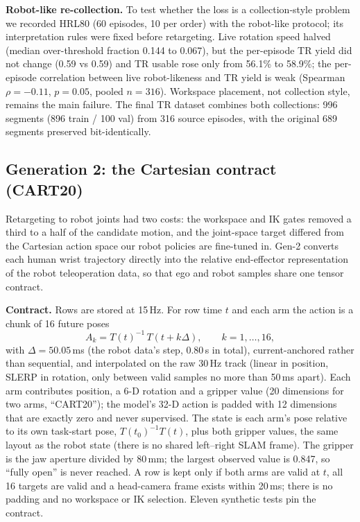\documentclass[conference,10pt]{IEEEtran}
\newcommand{\mm}{\,mm\xspace}
\begin{document}
\textbf{Robot-like re-collection.} To test whether the loss is a collection-style problem we recorded HRL80 (60 episodes, 10 per
order) with the robot-like protocol; its interpretation rules were fixed before retargeting. Live rotation speed halved (median
over-threshold fraction 0.144 to 0.067), but the per-episode TR yield did not change (0.59 vs 0.59) and TR usable rose only from
56.1\% to 58.9\%; the per-episode correlation between live robot-likeness and TR yield is weak (Spearman $\rho=-0.11$, $p=0.05$,
pooled $n=316$). Workspace placement, not collection style, remains the main failure. The final TR dataset combines both
collections: 996 segments (896 train / 100 val) from 316 source episodes, with the original 689 segments preserved bit-identically.

\subsection{Generation 2: the Cartesian contract (CART20)}
Retargeting to robot joints had two costs: the workspace and IK gates removed a third to a half of the candidate motion, and the
joint-space target differed from the Cartesian action space our robot policies are fine-tuned in. Gen-2 converts each human wrist
trajectory directly into the relative end-effector representation of the robot teleoperation data, so that ego and robot samples
share one tensor contract.

\textbf{Contract.} Rows are stored at 15\,Hz. For row time $t$ and each arm the action is a chunk of 16 future poses
\begin{equation}
A_k = T(t)^{-1}\,T(t+k\Delta),\qquad k=1,\dots,16,
\end{equation}
with $\Delta = 50.05$\,ms (the robot data's step, 0.80\,s in total), current-anchored rather than sequential, and interpolated on
the raw 30\,Hz track (linear in position, SLERP in rotation, only between valid samples no more than 50\,ms apart). Each arm
contributes position, a 6-D rotation and a gripper value (20 dimensions for two arms, ``CART20''); the model's 32-D action is padded
with 12 dimensions that are exactly zero and never supervised. The state is each arm's pose relative to its own task-start pose,
$T(t_0)^{-1}T(t)$, plus both gripper values, the same layout as the robot state (there is no shared left--right SLAM frame). The
gripper is the jaw aperture divided by 80\mm; the largest observed value is 0.847, so ``fully open'' is never reached. A row is
kept only if both arms are valid at $t$, all 16 targets are valid and a head-camera frame exists within 20\,ms; there is no padding
and no workspace or IK selection. Eleven synthetic tests pin the contract.
\end{document}
